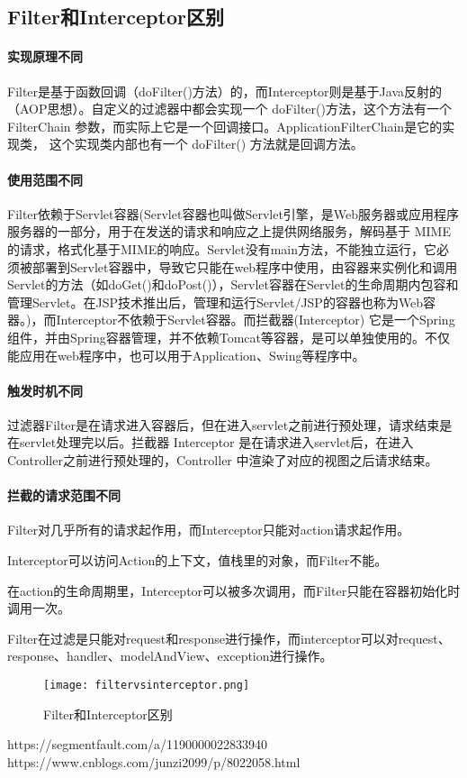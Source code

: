 \documentclass[../../../interview-questions.tex]{subfiles}
\begin{document}
\subsection{Filter和Interceptor区别}

\paragraph{实现原理不同}

Filter是基于函数回调（doFilter()方法）的，而Interceptor则是基于Java反射的（AOP思想）。自定义的过滤器中都会实现一个 doFilter()方法，这个方法有一个FilterChain 参数，而实际上它是一个回调接口。ApplicationFilterChain是它的实现类， 这个实现类内部也有一个 doFilter() 方法就是回调方法。

\paragraph{使用范围不同}

Filter依赖于Servlet容器(Servlet容器也叫做Servlet引擎，是Web服务器或应用程序服务器的一部分，用于在发送的请求和响应之上提供网络服务，解码基于 MIME的请求，格式化基于MIME的响应。Servlet没有main方法，不能独立运行，它必须被部署到Servlet容器中，导致它只能在web程序中使用，由容器来实例化和调用 Servlet的方法（如doGet()和doPost()），Servlet容器在Servlet的生命周期内包容和管理Servlet。在JSP技术推出后，管理和运行Servlet/JSP的容器也称为Web容器。)，而Interceptor不依赖于Servlet容器。而拦截器(Interceptor) 它是一个Spring组件，并由Spring容器管理，并不依赖Tomcat等容器，是可以单独使用的。不仅能应用在web程序中，也可以用于Application、Swing等程序中。

\paragraph{触发时机不同}

过滤器Filter是在请求进入容器后，但在进入servlet之前进行预处理，请求结束是在servlet处理完以后。拦截器 Interceptor 是在请求进入servlet后，在进入Controller之前进行预处理的，Controller 中渲染了对应的视图之后请求结束。

\paragraph{拦截的请求范围不同}

Filter对几乎所有的请求起作用，而Interceptor只能对action请求起作用。

Interceptor可以访问Action的上下文，值栈里的对象，而Filter不能。

在action的生命周期里，Interceptor可以被多次调用，而Filter只能在容器初始化时调用一次。

Filter在过滤是只能对request和response进行操作，而interceptor可以对request、response、handler、modelAndView、exception进行操作。

\begin{figure}[htbp]
	\centering
	\texttt{[image: filtervsinterceptor.png]}
	\caption{Filter和Interceptor区别}
	\label{fig:filtervsinterceptor}
\end{figure}


https://segmentfault.com/a/1190000022833940
https://www.cnblogs.com/junzi2099/p/8022058.html
\end{document}
